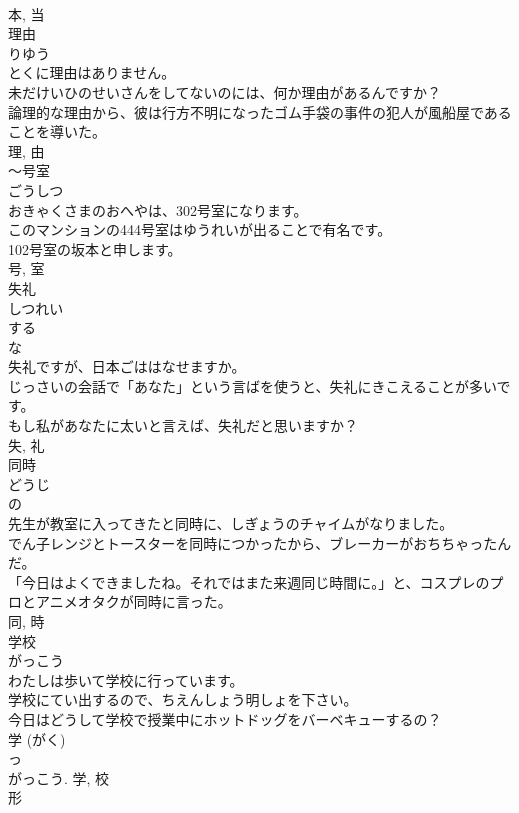 \documentclass[8pt]{extreport}
\begin{document}
\begin{CJK}{UTF8}{min}
\\	本, 当	
\\	理由	
\\	りゆう	
\\	とくに理由はありません。	
\\	未だけいひのせいさんをしてないのには、何か理由があるんですか？	
\\	論理的な理由から、彼は行方不明になったゴム手袋の事件の犯人が風船屋であることを導いた。	
\\	理, 由	
\\	〜号室	
\\	ごうしつ	
\\	おきゃくさまのおへやは、302号室になります。	
\\	このマンションの444号室はゆうれいが出ることで有名です。	
\\	102号室の坂本と申します。	
\\	号, 室	
\\	失礼	
\\	しつれい	
\\	する 
\\	な 
\\	失礼ですが、日本ごははなせますか。	
\\	じっさいの会話で「あなた」という言ばを使うと、失礼にきこえることが多いです。	
\\	もし私があなたに太いと言えば、失礼だと思いますか？	
\\	失, 礼	
\\	同時	
\\	どうじ	
\\	の 
\\	先生が教室に入ってきたと同時に、しぎょうのチャイムがなりました。	
\\	でん子レンジとトースターを同時につかったから、ブレーカーがおちちゃったんだ。	
\\	「今日はよくできましたね。それではまた来週同じ時間に。」と、コスプレのプロとアニメオタクが同時に言った。	
\\	同, 時	
\\	学校	
\\	がっこう	
\\	わたしは歩いて学校に行っています。	
\\	学校にてい出するので、ちえんしょう明しょを下さい。	
\\	今日はどうして学校で授業中にホットドッグをバーベキューするの？	
\\	学 (がく) 
\\	っ 
\\	がっこう.	学, 校	
\\	形	

\end{CJK}
\end{document}
